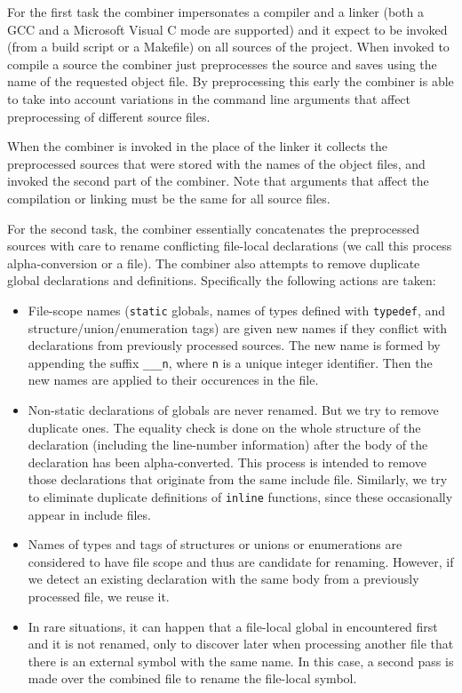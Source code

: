 \documentclass{book}
\def\t#1{{\tt #1}}
\begin{document}
 For the first task the combiner impersonates a compiler and a linker (both a
GCC and a Microsoft Visual C mode are supported) and it expect to be invoked
(from a build script or a Makefile) on all sources of the project. When
invoked to compile a source the combiner just preprocesses the source and
saves using the name of the requested object file. By preprocessing this early
the combiner is able to take into account variations in the command line
arguments that affect preprocessing of different source files. 

 When the combiner is invoked in the place of the linker it collects the
preprocessed sources that were stored with the names of the object files, and
invoked the second part of the combiner. Note that arguments that affect the
compilation or linking must be the same for all source files.

 For the second task, the combiner essentially concatenates the preprocessed
sources with care to rename conflicting file-local declarations (we call this
process alpha-conversion or a file). The combiner also attempts to remove
duplicate global declarations and definitions. Specifically the following
actions are taken: 

\begin{itemize}
\item File-scope names (\t{static} globals, names of types defined with
\t{typedef}, and structure/union/enumeration tags) are given new names if they
conflict with declarations from previously processed sources. The new name is
formed by appending the suffix \t{\_\_\_n}, where \t{n} is a unique integer
identifier. Then the new names are applied to their occurences in the file. 

\item Non-static declarations of globals are never renamed. But we try to
remove duplicate ones. The equality check is done on the whole structure of
the declaration (including the line-number information) after the body of the
declaration has been alpha-converted. This process is intended to remove those
declarations that originate from the same include file. Similarly, we try to
eliminate duplicate definitions of \t{inline} functions, since these
occasionally appear in include files.

\item Names of types and tags of structures or unions or enumerations are
considered to have file scope and thus are candidate for renaming. However, if
we detect an existing declaration with the same body from a previously
processed file, we reuse it.

\item In rare situations, it can happen that a file-local global in
encountered first and it is not renamed, only to discover later when
processing another file that there is an external symbol with the same name.
In this case, a second pass is made over the combined file to rename the
file-local symbol. 
\end{itemize}
\end{document}
